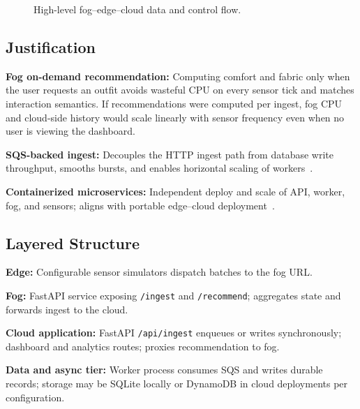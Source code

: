 \documentclass[conference]{IEEEtran}
\begin{document}
\begin{figure}[htbp]
\centering
{}
\caption{High-level fog--edge--cloud data and control flow.}
\label{fig:arch}
\end{figure}

\subsection{Justification}
\textbf{Fog on-demand recommendation:} Computing comfort and fabric only when the user requests an outfit avoids wasteful CPU on every sensor tick and matches interaction semantics. If recommendations were computed per ingest, fog CPU and cloud-side history would scale linearly with sensor frequency even when no user is viewing the dashboard.

\textbf{SQS-backed ingest:} Decouples the HTTP ingest path from database write throughput, smooths bursts, and enables horizontal scaling of workers~\cite{sqsdocs,azurepatterns}.

\textbf{Containerized microservices:} Independent deploy and scale of API, worker, fog, and sensors; aligns with portable edge--cloud deployment~\cite{pahl2015}.

\subsection{Layered Structure}
\textbf{Edge:} Configurable sensor simulators dispatch batches to the fog URL.

\textbf{Fog:} FastAPI service exposing \texttt{/ingest} and \texttt{/recommend}; aggregates state and forwards ingest to the cloud.

\textbf{Cloud application:} FastAPI \texttt{/api/ingest} enqueues or writes synchronously; dashboard and analytics routes; proxies recommendation to fog.

\textbf{Data and async tier:} Worker process consumes SQS and writes durable records; storage may be SQLite locally or DynamoDB in cloud deployments per configuration.
\end{document}
